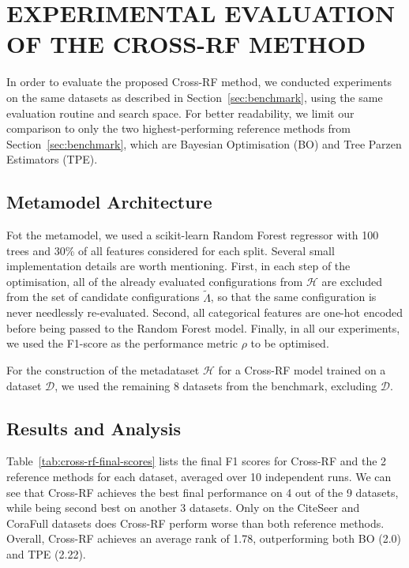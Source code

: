 \section{\uppercase{Experimental evaluation of the Cross-RF method}}
\label{sec:experimental-evaluation}

In order to evaluate the proposed Cross-RF method, we conducted experiments on the same datasets as described in Section~\ref{sec:benchmark}, using the same evaluation routine and search space. For better readability, we limit our comparison to only the two highest-performing reference methods from Section~\ref{sec:benchmark}, which are Bayesian Optimisation (BO) and Tree Parzen Estimators (TPE).

\subsection{Metamodel Architecture}

Fot the metamodel, we used a scikit-learn Random Forest regressor with 100 trees and 30\% of all features considered for each split. Several small implementation details are worth mentioning. First, in each step of the optimisation, all of the already evaluated configurations from \( \mathcal{H} \) are excluded from the set of candidate configurations \( \tilde{\Lambda} \), so that the same configuration is never needlessly re-evaluated. Second, all categorical features are one-hot encoded before being passed to the Random Forest model. Finally, in all our experiments, we used the F1-score as the performance metric \( \rho \) to be optimised.

For the construction of the metadataset \( \mathcal{H} \) for a Cross-RF model trained on a dataset \( \mathcal{D} \), we used the remaining 8 datasets from the benchmark, excluding \( \mathcal{D} \).

\subsection{Results and Analysis}
Table~\ref{tab:cross-rf-final-scores} lists the final F1 scores for Cross-RF and the 2 reference methods for each dataset, averaged over 10 independent runs. We can see that Cross-RF achieves the best final performance on 4 out of the 9 datasets, while being second best on another 3 datasets. Only on the CiteSeer and CoraFull datasets does Cross-RF perform worse than both reference methods. Overall, Cross-RF achieves an average rank of 1.78, outperforming both BO (2.0) and TPE (2.22).

